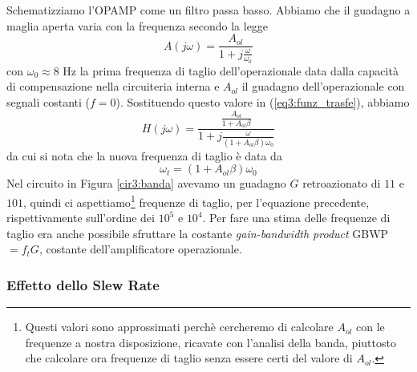 Schematizziamo l'OPAMP come un filtro passa basso. Abbiamo che il guadagno a maglia aperta varia con la frequenza secondo la legge
\begin{equation}
A(j\omega)=\frac{A_{ol}}{1+j\frac{\omega}{\omega_0}}
\label{eq3:passa_basso}
\end{equation}
con $\omega_0 \approx 8$ \si{\hertz} la prima frequenza di taglio dell'operazionale data dalla capacità di compensazione nella circuiteria interna e $A_{ol}$ il guadagno dell'operazionale con segnali costanti ($f = 0$). Sostituendo questo valore in (\ref{eq3:funz_trasfe}), abbiamo
\begin{equation}
H(j\omega)=\frac{\frac{A_{ol}}{1+A_{ol}\beta}}{1+j \frac{\omega}{(1+A_{ol}\beta)\omega_0}}
\label{eq3:funzione_trasferimento}
\end{equation}
da cui si nota che la nuova frequenza di taglio è data da
\begin{equation}
\omega_t=(1+A_{ol}\beta)\omega_0
\label{eq3:freq_taglio}
\end{equation}
Nel circuito in Figura \ref{cir3:banda} avevamo un guadagno $G$ retroazionato di $11$ e $101$, quindi ci aspettiamo\footnote{Questi valori sono approssimati perchè cercheremo di calcolare $A_{ol}$ con le frequenze a nostra disposizione, ricavate con l'analisi della banda, piuttosto che calcolare ora frequenze di taglio senza essere certi del valore di $A_{ol}$.} frequenze di taglio, per l'equazione precedente, rispettivamente sull'ordine dei $10^5$ e $10^4$. Per fare una stima delle frequenze di taglio era anche possibile sfruttare la costante \textit{gain-bandwidth product} GBWP $= f_t G$, costante dell'amplificatore operazionale.

\subsubsection*{Effetto dello Slew Rate}

